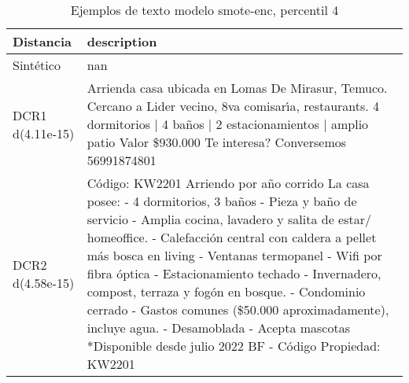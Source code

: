 \begin{table}[H]
\centering
\fontsize{10}{14}\selectfont
\caption{Ejemplos de texto modelo smote-enc, percentil 4}
\label{table-example-economicos-b-3-smote-enc-4p-text}
\begin{tabular}{|l|m{35em}|}
\hline
\rowcolor[gray]{0.8}
Distancia & description \\
\hline Sintético & nan \\
\hline DCR1 d(4.11e-15) & Arrienda casa ubicada en Lomas De Mirasur, Temuco. Cercano a Lider vecino, 8va comisar{\'\i}a, restaurants. 4 dormitorios | 4 ba\~nos | 2 estacionamientos | amplio patio Valor \$930.000   Te interesa? Conversemos 56991874801 \\
\hline DCR2 d(4.58e-15) & C\'odigo: KW2201 Arriendo por a\~no corrido  La casa posee: - 4 dormitorios, 3 ba\~nos - Pieza y ba\~no de servicio - Amplia cocina, lavadero y salita de estar/ homeoffice.  - Calefacci\'on central con caldera a pellet m\'as  bosca en living  - Ventanas termopanel  - Wifi por fibra \'optica  - Estacionamiento techado  - Invernadero, compost, terraza y fog\'on en bosque. - Condominio cerrado  -  Gastos comunes (\$50.000 aproximadamente), incluye agua.  - Desamoblada  - Acepta mascotas   *Disponible desde julio 2022  BF - C\'odigo Propiedad: KW2201 \\
\hline
\end{tabular}
\end{table}
